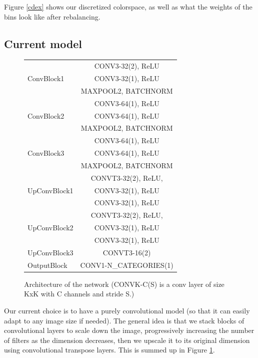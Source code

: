 \documentclass[10pt,twocolumn,letterpaper]{article}
\begin{document}
Figure \ref{cdex} shows our discretized colorspace, as well as what the weights of the bins look like after rebalancing.


\subsection{Current model}

\begin{figure}
\begin{center}
 \begin{tabular}{|l |c|}
 \hline
 \multirow{3}{60pt}{ConvBlock1}&CONV3-32(2), ReLU\\
    &CONV3-32(1), ReLU\\
    & MAXPOOL2, BATCHNORM \\
 \hline
  \multirow{3}{60pt}{ConvBlock2}&CONV3-64(1), ReLU\\
    &CONV3-64(1), ReLU\\
    & MAXPOOL2, BATCHNORM \\
 \hline
   \multirow{3}{60pt}{ConvBlock3}&CONV3-64(1), ReLU\\
    &CONV3-64(1), ReLU\\
    & MAXPOOL2, BATCHNORM \\
 \hline
    \multirow{3}{60pt}{UpConvBlock1}&CONVT3-32(2), ReLU,\\
    &CONV3-32(1), ReLU\\
    & CONV3-32(1), ReLU \\
 \hline
    \multirow{3}{60pt}{UpConvBlock2}&CONVT3-32(2), ReLU,\\
    &CONV3-32(1), ReLU\\
    & CONV3-32(1), ReLU \\
 \hline
 UpConvBlock3 & CONVT3-16(2)\\
 \hline
 OutputBlock & CONV1-N\_CATEGORIES(1)\\
 \hline
\end{tabular}
\end{center}
\caption{Architecture of the network (CONVK-C(S) is a conv layer of size KxK with C channels and stride S.)}
\label{archi}
\end{figure}

Our current choice is to have a purely convolutional model (so that it can easily adapt to any image size if needed).
The general idea is that we stack blocks of convolutional layers to scale down the image, progressively increasing the number of filters as the dimension decreases, then we upscale it to its original dimension using convolutional transpose layers.
This is summed up in Figure \ref{archi}.
\end{document}
